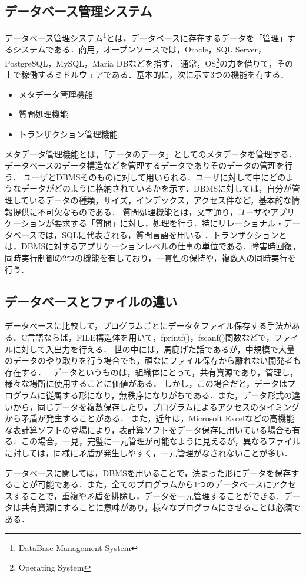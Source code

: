 \documentclass[a4paper,10pt]{jreport}
\begin{document}
\subsection{データベース管理システム}
データベース管理システム\footnote{DataBase Management System}とは，データベースに存在するデータを「管理」するシステムである．商用，オープンソースでは，Oracle，SQL Server，PostgreSQL，MySQL，Maria DBなどを指す．
通常，OS\footnote{Operating System}の力を借りて，その上で稼働するミドルウェアである．基本的に，次に示す3つの機能を有する．
\begin{itemize}
	\item メタデータ管理機能
	\item 質問処理機能
	\item トランザクション管理機能
\end{itemize}
\par メタデータ管理機能とは，「データのデータ」としてのメタデータを管理する．データベースのデータ構造などを管理するデータでありそのデータの管理を行う．
ユーザとDBMSそのものに対して用いられる．ユーザに対して中にどのようなデータがどのように格納されているかを示す．DBMSに対しては，自分が管理しているデータの種類，サイズ，インデックス，アクセス件など，基本的な情報提供に不可欠なものである．
質問処理機能とは，文字通り，ユーザやアプリケーションが要求する「質問」に対し，処理を行う．特にリレーショナル・データベースでは，SQLに代表される，質問言語を用いる
．トランザクションとは，DBMSに対するアプリケーションレベルの仕事の単位である．障害時回復，同時実行制御の2つの機能を有しており，一貫性の保持や，複数人の同時実行を行う．

\subsection{データベースとファイルの違い}
データベースに比較して，プログラムごとにデータをファイル保存する手法がある．C言語ならば，FILE構造体を用いて，fprintf()，fscanf()関数などで，ファイルに対して入出力を行える．
世の中には，馬鹿げた話であるが，中規模で大量のデータのやり取りを行う場合でも，頑なにファイル保存から離れない開発者も存在する．　
データというものは，組織体にとって，共有資源であり，管理し，様々な場所に使用することに価値がある．
しかし，この場合だと，データはプログラムに従属する形になり，無秩序になりがちである．また，データ形式の違いから，同じデータを複数保存したり，プログラムによるアクセスのタイミングから矛盾が発生することがある．
また，近年は，Microsoft Excelなどの高機能な表計算ソフトの登場により，表計算ソフトをデータ保存に用いている場合も有る．この場合，一見，完璧に一元管理が可能なように見えるが，異なるファイルに対しては，同様に矛盾が発生しやすく，一元管理がなされないことが多い．
\par データベースに関しては，DBMSを用いることで，決まった形にデータを保存することが可能である．また，全てのプログラムから1つのデータベースにアクセスすることで，重複や矛盾を排除し，データを一元管理することができる．データは共有資源にすることに意味があり，様々なプログラムにさせることは必須である．
\end{document}
